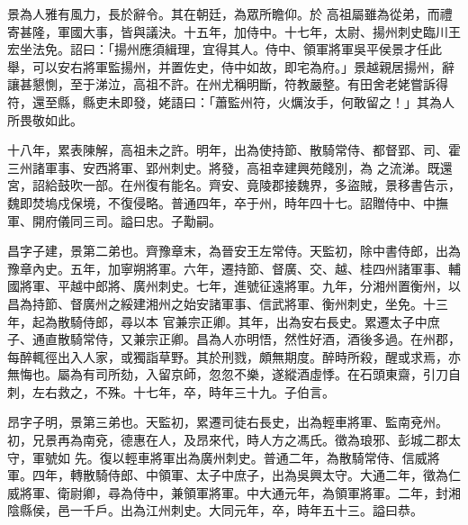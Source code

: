 \begin{pinyinscope}
 景為人雅有風力，長於辭令。其在朝廷，為眾所瞻仰。於
 高祖屬雖為從弟，而禮寄甚隆，軍國大事，皆與議決。十五年，加侍中。十七年，太尉、揚州刺史臨川王宏坐法免。詔曰：「揚州應須緝理，宜得其人。侍中、領軍將軍吳平侯景才任此舉，可以安右將軍監揚州，并置佐史，侍中如故，即宅為府。」景越親居揚州，辭讓甚懇惻，至于涕泣，高祖不許。在州尤稱明斷，符教嚴整。有田舍老姥嘗訴得符，還至縣，縣吏未即發，姥語曰：「蕭監州符，火爄汝手，何敢留之！」其為人所畏敬如此。



 十八年，累表陳解，高祖未之許。明年，出為使持節、散騎常侍、都督郢、司、霍三州諸軍事、安西將軍、郢州刺史。將發，高祖幸建興苑餞別，為
 之流涕。既還宮，詔給鼓吹一部。在州復有能名。齊安、竟陵郡接魏界，多盜賊，景移書告示，魏即焚塢戍保境，不復侵略。普通四年，卒于州，時年四十七。詔贈侍中、中撫軍、開府儀同三司。謚曰忠。子勱嗣。



 昌字子建，景第二弟也。齊豫章末，為晉安王左常侍。天監初，除中書侍郎，出為豫章內史。五年，加寧朔將軍。六年，遷持節、督廣、交、越、桂四州諸軍事、輔國將軍、平越中郎將、廣州刺史。七年，進號征遠將軍。九年，分湘州置衡州，以昌為持節、督廣州之綏建湘州之始安諸軍事、信武將軍、衡州刺史，坐免。十三年，起為散騎侍郎，尋以本
 官兼宗正卿。其年，出為安右長史。累遷太子中庶子、通直散騎常侍，又兼宗正卿。昌為人亦明悟，然性好酒，酒後多過。在州郡，每醉輒徑出入人家，或獨詣草野。其於刑戮，頗無期度。醉時所殺，醒或求焉，亦無悔也。屬為有司所劾，入留京師，忽忽不樂，遂縱酒虛悸。在石頭東齋，引刀自刺，左右救之，不殊。十七年，卒，時年三十九。子伯言。



 昂字子明，景第三弟也。天監初，累遷司徒右長史，出為輕車將軍、監南兗州。初，兄景再為南兗，德惠在人，及昂來代，時人方之馮氏。徵為琅邪、彭城二郡太守，軍號如
 先。復以輕車將軍出為廣州刺史。普通二年，為散騎常侍、信威將軍。四年，轉散騎侍郎、中領軍、太子中庶子，出為吳興太守。大通二年，徵為仁威將軍、衛尉卿，尋為侍中，兼領軍將軍。中大通元年，為領軍將軍。二年，封湘陰縣侯，邑一千戶。出為江州刺史。大同元年，卒，時年五十三。謚曰恭。




\end{pinyinscope}
